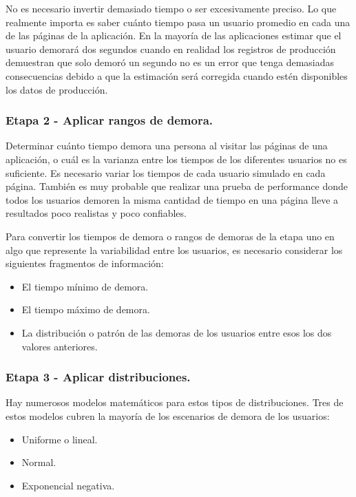 No es necesario invertir demasiado tiempo o ser excesivamente preciso. Lo que realmente importa es saber cuánto tiempo pasa un usuario promedio en cada una de las páginas de
la aplicación. En la mayoría de las aplicaciones estimar que el usuario demorará dos segundos cuando en realidad los registros de producción demuestran que solo demoró un
segundo no es un error que tenga demasiadas consecuencias debido a que la estimación será corregida cuando estén disponibles los datos de producción.

\subsubsection{Etapa 2 - Aplicar rangos de demora.}

Determinar cuánto tiempo demora una persona al visitar las páginas de una aplicación, o cuál es la varianza entre los tiempos de los diferentes usuarios no es suficiente. Es
necesario variar los tiempos de cada usuario simulado en cada página. También es muy probable que realizar una prueba de performance donde todos los usuarios demoren la
misma cantidad de tiempo en una página lleve a resultados poco realistas y poco confiables.

Para convertir los tiempos de demora o rangos de demoras de la etapa uno en algo que represente la variabilidad entre los usuarios, es necesario considerar los siguientes
fragmentos de información:
\begin{itemize}
	\item
	El tiempo mínimo de demora.
	\item
	El tiempo máximo de demora.
	\item
	La distribución o patrón de las demoras de los usuarios entre esos los dos valores anteriores.
\end{itemize}

\subsubsection{Etapa 3 - Aplicar distribuciones.}
Hay numerosos modelos matemáticos para estos tipos de distribuciones. Tres de estos modelos cubren la mayoría de los escenarios de demora de los usuarios:
\begin{itemize}
	\item
	Uniforme o lineal.
	\item
	Normal.
	\item
	Exponencial negativa.
\end{itemize}

